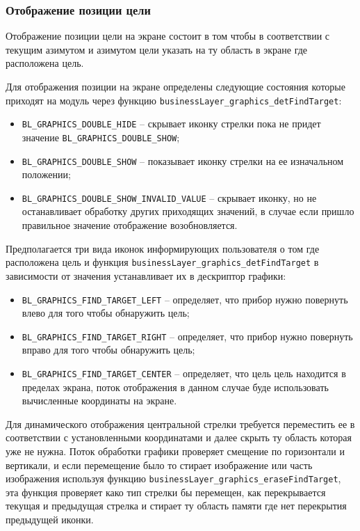 \subsubsection{Отображение позиции цели}

Отображение позиции цели на экране состоит в том чтобы в соответствии с текущим азимутом и азимутом цели указать на ту область в экране где расположена цель.

Для отображения позиции на экране определены следующие состояния которые приходят на модуль через функцию \lstinline{businessLayer_graphics_detFindTarget}:

\begin{itemize}
    \item \lstinline{BL_GRAPHICS_DOUBLE_HIDE} -- скрывает иконку стрелки пока не придет значение \lstinline{BL_GRAPHICS_DOUBLE_SHOW};
    \item \lstinline{BL_GRAPHICS_DOUBLE_SHOW} -- показывает иконку стрелки на ее изначальном положении;
    \item \lstinline{BL_GRAPHICS_DOUBLE_SHOW_INVALID_VALUE} -- скрывает иконку, но не останавливает обработку других приходящих значений, в случае если пришло правильное значение
    отображение возобновляется.
\end{itemize}

Предполагается три вида иконок информирующих пользователя о том где расположена цель и функция \lstinline{businessLayer_graphics_detFindTarget} в зависимости от значения устанавливает их
в дескриптор графики:

\begin{itemize}
    \item \lstinline{BL_GRAPHICS_FIND_TARGET_LEFT} -- определяет, что прибор нужно повернуть влево для того чтобы обнаружить цель;
    \item \lstinline{BL_GRAPHICS_FIND_TARGET_RIGHT} -- определяет, что прибор нужно повернуть вправо для того чтобы обнаружить цель; 
    \item \lstinline{BL_GRAPHICS_FIND_TARGET_CENTER} -- определяет, что цель цель находится в пределах экрана, поток отображения в данном случае буде использовать
    вычисленные координаты на экране.
\end{itemize}

Для динамического отображения центральной стрелки требуется переместить ее в соответствии с установленными координатами и далее скрыть ту область которая уже не нужна.
Поток обработки графики проверяет смещение по горизонтали и вертикали, и если перемещение было то стирает изображение или часть изображения используя функцию
\lstinline{businessLayer_graphics_eraseFindTarget}, эта функция проверяет како тип стрелки бы перемещен, как перекрывается текущая и предыдущая стрелка и стирает
ту область памяти где нет перекрытия предыдущей иконки. 

